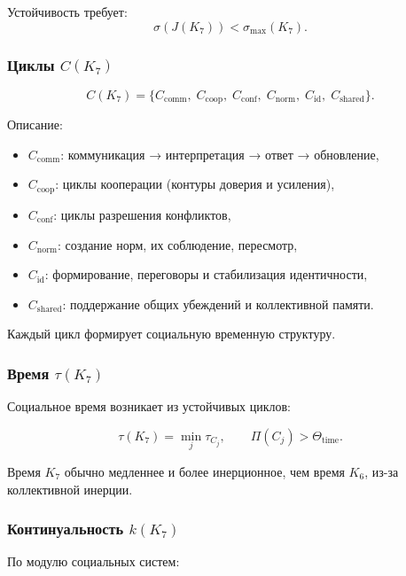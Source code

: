 Устойчивость требует:
\[
\sigma(J(K_7)) < \sigma_{\max}(K_7).
\]

\subsubsection{Циклы \texorpdfstring{$C(K_7)$}{C(K_7)}}

\[
C(K_7)=
\{
C_{\mathrm{comm}},\;
C_{\mathrm{coop}},\;
C_{\mathrm{conf}},\;
C_{\mathrm{norm}},\;
C_{\mathrm{id}},\;
C_{\mathrm{shared}}
\}.
\]

Описание:
\begin{itemize}
    \item $C_{\mathrm{comm}}$: коммуникация → интерпретация → ответ → обновление,
    \item $C_{\mathrm{coop}}$: циклы кооперации (контуры доверия и усиления),
    \item $C_{\mathrm{conf}}$: циклы разрешения конфликтов,
    \item $C_{\mathrm{norm}}$: создание норм, их соблюдение, пересмотр,
    \item $C_{\mathrm{id}}$: формирование, переговоры и стабилизация идентичности,
    \item $C_{\mathrm{shared}}$: поддержание общих убеждений и коллективной памяти.
\end{itemize}

Каждый цикл формирует социальную временную структуру.

\subsubsection{Время \texorpdfstring{$\tau(K_7)$}{\tau(K_7)}}

Социальное время возникает из устойчивых циклов:

\[
\tau(K_7)
= \min_j \tau_{C_j},
\qquad
\Pi(C_j) > \Theta_{\mathrm{time}}.
\]

Время $K_7$ обычно медленнее и более инерционное, чем время $K_6$, из-за
коллективной инерции.

\subsubsection{Континуальность \texorpdfstring{$k(K_7)$}{k(K_7)}}

По модулю социальных систем:

